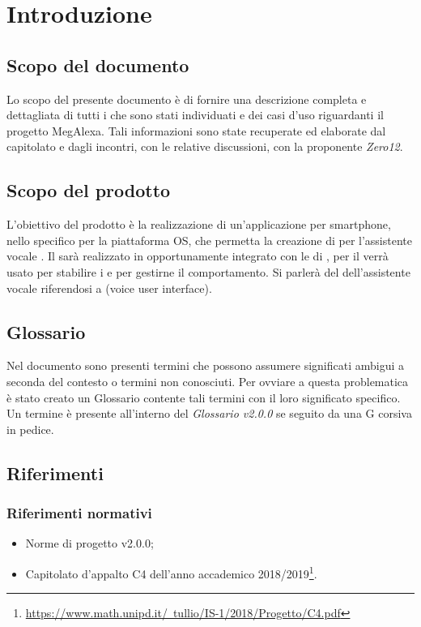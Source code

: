 \clearpage
\section{Introduzione}
\label{sec:intro}
\subsection{Scopo del documento}
Lo scopo del presente documento è di fornire una descrizione completa e dettagliata di tutti i  che sono stati individuati e dei casi d'uso riguardanti il progetto MegAlexa.
Tali informazioni sono state recuperate ed elaborate dal capitolato e dagli incontri, con le relative discussioni, con la proponente \emph{Zero12}.
\subsection{Scopo del prodotto}
L'obiettivo del prodotto è la realizzazione di un'applicazione per smartphone, nello specifico per la piattaforma  OS, che permetta la creazione di  per l'assistente vocale  . Il  sarà realizzato in  opportunamente integrato con le  di , per il  verrà usato  per stabilire i  e  per gestirne il comportamento. Si parlerà del  dell'assistente vocale riferendosi a  (voice user interface).
\subsection{Glossario}
Nel documento sono presenti termini che possono assumere significati ambigui a seconda del contesto o termini non conosciuti. Per ovviare a questa problematica è stato creato un Glossario contente tali termini con il loro significato specifico. Un termine è presente all'interno del \emph{Glossario v2.0.0} se seguito da una G corsiva in pedice.
\subsection{Riferimenti}
\subsubsection{Riferimenti normativi}
\begin{itemize}
	\item Norme di progetto v2.0.0;
	\item Capitolato d’appalto C4 dell'anno accademico 2018/2019\footnote{\href{https://www.math.unipd.it/~tullio/IS-1/2018/Progetto/C4.pdf}{https://www.math.unipd.it/~tullio/IS-1/2018/Progetto/C4.pdf}}.
\end{itemize}
